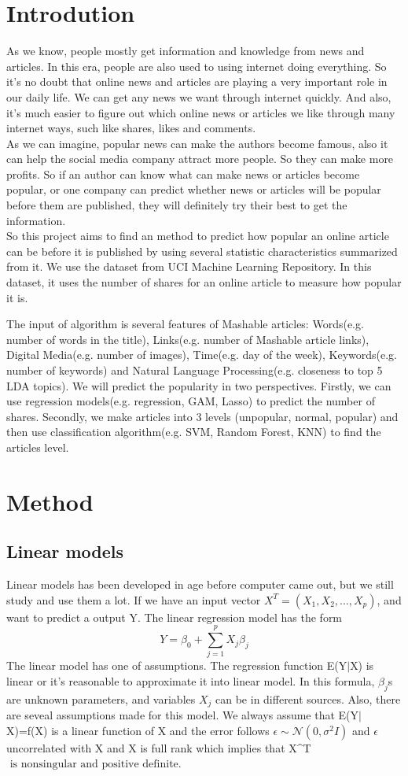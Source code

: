\documentclass[11pt]{article}
\begin{document}
\section{Introdution}
As we know, people mostly get information and knowledge from news and articles. In this era, people are also used to using internet doing everything. So it’s no doubt that online news and articles are playing a very important role in our daily life. We can get any news we want through internet quickly. And also, it’s much easier to figure out which online news or articles we like through many internet ways, such like shares, likes and comments. \\ 
As we can imagine, popular news can make the authors become famous, also it can help the social media company attract more people. So they can make more profits. So if an author can know what can make news or articles become popular, or one company can predict whether news or articles will be popular before them are published, they will definitely try their best to get the information.  \\
So this project aims to find an method to predict how popular an online article can be before it is published by using several statistic characteristics summarized from it. We use the dataset from UCI Machine Learning Repository. In this dataset, it uses the number of shares for an online article to measure how popular it is.   

The input of algorithm is several features of Mashable articles: Words(e.g. number of words in the title), Links(e.g. number of Mashable article links), Digital Media(e.g. number of images), Time(e.g. day of the week), Keywords(e.g. number of keywords) and Natural Language Processing(e.g. closeness to top 5 LDA topics). We will predict the popularity in two perspectives. Firstly, we can use regression models(e.g. regression, GAM, Lasso) to predict the number of shares. Secondly, we make articles into 3 levels (unpopular, normal, popular) and then use classification algorithm(e.g. SVM, Random Forest, KNN) to find the articles level.  

\section{Method}
\subsection{Linear models}  
Linear models has been developed in age before computer came out, but we still study and use them a lot. If we have an input vector $X^T=(X_1,X_2,...,X_p)$, and want to predict a output Y. The linear regression model has the form $$Y=\beta_0+\sum_{j=1}^{p} X_j\beta_j$$
The linear model has one of assumptions. The regression function E(Y$\mid$X) is linear or it's reasonable to approximate it into linear model. In this formula, $\beta_j$s are unknown parameters, and variables $X_j$ can be in different sources.  
Also, there are seveal assumptions made for this model. We always assume that E(Y$\mid$X)=f(X) is a linear function of X and the error follows $\epsilon \sim \mathcal N(0, \sigma^2I)$ and $\epsilon$ uncorrelated with X and X is full rank which implies that X^T $\text{ is nonsingular and positive definite.}$
\end{document}
